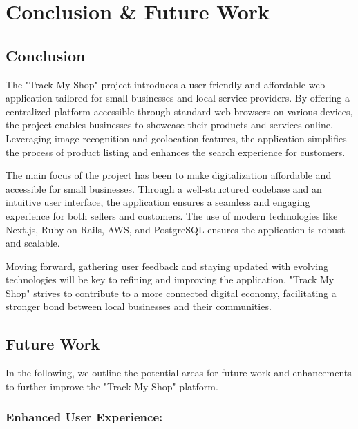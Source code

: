 
\chapter{Conclusion \& Future Work} %

\label{Chapter5} %



\section{Conclusion}
The "Track My Shop" project introduces a user-friendly and affordable web application tailored for small businesses and local service providers. By offering a centralized platform accessible through standard web browsers on various devices, the project enables businesses to showcase their products and services online. Leveraging image recognition and geolocation features, the application simplifies the process of product listing and enhances the search experience for customers.

The main focus of the project has been to make digitalization affordable and accessible for small businesses. Through a well-structured codebase and an intuitive user interface, the application ensures a seamless and engaging experience for both sellers and customers. The use of modern technologies like Next.js, Ruby on Rails, AWS, and PostgreSQL ensures the application is robust and scalable.

Moving forward, gathering user feedback and staying updated with evolving technologies will be key to refining and improving the application. "Track My Shop" strives to contribute to a more connected digital economy, facilitating a stronger bond between local businesses and their communities.


\section{Future Work}
In the following, we outline the potential areas for future work and enhancements to further improve the "Track My Shop" platform.

\subsection{Enhanced User Experience:}


